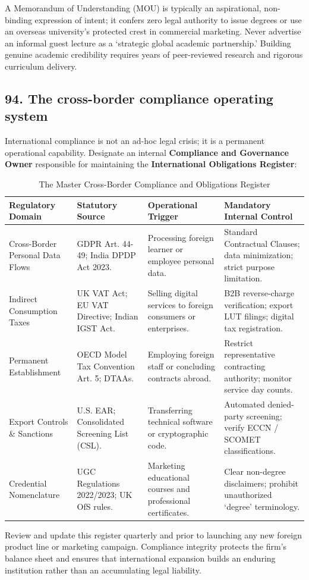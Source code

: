 A Memorandum of Understanding (MOU) is typically an aspirational, non-binding expression of intent; it confers zero legal authority to issue degrees or use an overseas university's protected crest in commercial marketing. Never advertise an informal guest lecture as a `strategic global academic partnership.' Building genuine academic credibility requires years of peer-reviewed research and rigorous curriculum delivery.

\subsection{94. The cross-border compliance operating system}

International compliance is not an ad-hoc legal crisis; it is a permanent operational capability. Designate an internal \textbf{Compliance and Governance Owner} responsible for maintaining the \textbf{International Obligations Register}:

\begin{table}[t]
\centering
\small
\caption{The Master Cross-Border Compliance and Obligations Register}
\label{tab:compliance_register}
\begin{tabularx}{\textwidth}{p{3.2cm} p{2.8cm} p{3.4cm} X}
\toprule
\textbf{Regulatory Domain} & \textbf{Statutory Source} & \textbf{Operational Trigger} & \textbf{Mandatory Internal Control} \\
\midrule
Cross-Border Personal Data Flows & GDPR Art. 44-49; India DPDP Act 2023. & Processing foreign learner or employee personal data. & Standard Contractual Clauses; data minimization; strict purpose limitation. \\
Indirect Consumption Taxes & UK VAT Act; EU VAT Directive; Indian IGST Act. & Selling digital services to foreign consumers or enterprises. & B2B reverse-charge verification; export LUT filings; digital tax registration. \\
Permanent Establishment & OECD Model Tax Convention Art. 5; DTAAs. & Employing foreign staff or concluding contracts abroad. & Restrict representative contracting authority; monitor service day counts. \\
Export Controls \& Sanctions & U.S. EAR; Consolidated Screening List (CSL). & Transferring technical software or cryptographic code. & Automated denied-party screening; verify ECCN / SCOMET classifications. \\
Credential Nomenclature & UGC Regulations 2022/2023; UK OfS rules. & Marketing educational courses and professional certificates. & Clear non-degree disclaimers; prohibit unauthorized `degree' terminology. \\
\bottomrule
\end{tabularx}
\end{table}

Review and update this register quarterly and prior to launching any new foreign product line or marketing campaign. Compliance integrity protects the firm's balance sheet and ensures that international expansion builds an enduring institution rather than an accumulating legal liability.

